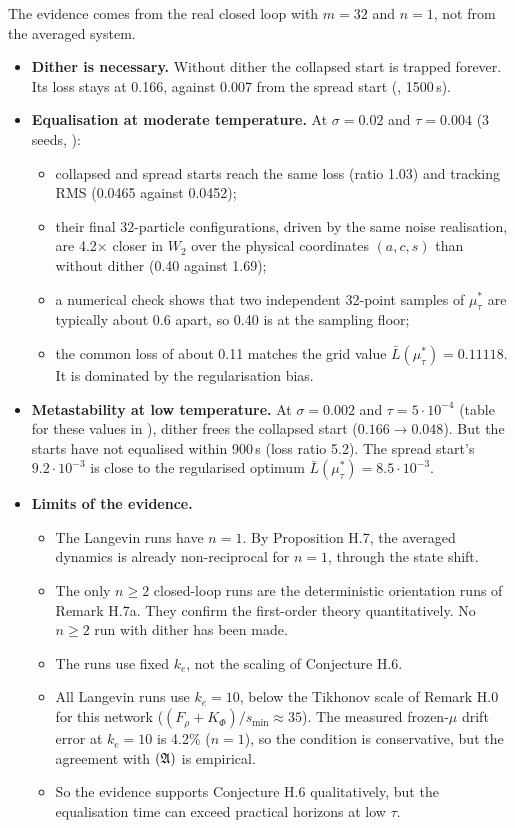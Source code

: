 The evidence comes from the real closed loop with $m=32$ and $n=1$, not from the averaged system.
\begin{itemize}
  \item \textbf{Dither is necessary.} Without dither the collapsed start is trapped forever. Its loss stays at 0.166,
    against 0.007 from the spread start (, 1500\,s).
  \item \textbf{Equalisation at moderate temperature.} At $\sigma=0.02$ and $\tau=0.004$ (3 seeds,
    ):
    \begin{itemize}
      \item collapsed and spread starts reach the same loss (ratio 1.03) and tracking RMS (0.0465 against 0.0452);
      \item their final 32-particle configurations, driven by the same noise realisation, are 4.2$\times$ closer in
        $W_2$ over the physical coordinates $(a,c,s)$ than without dither (0.40 against 1.69);
      \item a numerical check shows that two independent 32-point samples of $\mu^*_\tau$ are typically about 0.6
        apart, so 0.40 is at the sampling floor;
      \item the common loss of about 0.11 matches the grid value $\bar L(\mu^*_\tau)=0.11118$. It is dominated by the
        regularisation bias.
    \end{itemize}
  \item \textbf{Metastability at low temperature.} At $\sigma=0.002$ and $\tau=5\cdot10^{-4}$ (table for these
    values in ), dither frees the collapsed start ($0.166\to0.048$). But the starts have
    not equalised within 900\,s (loss ratio 5.2). The spread start's $9.2\cdot10^{-3}$ is close to the regularised
    optimum $\bar L(\mu^*_\tau)=8.5\cdot10^{-3}$.
  \item \textbf{Limits of the evidence.}
    \begin{itemize}
      \item The Langevin runs have $n=1$. By Proposition H.7, the averaged dynamics is already non-reciprocal for
        $n=1$, through the state shift.
      \item The only $n\ge2$ closed-loop runs are the deterministic orientation runs of Remark H.7a. They confirm the
        first-order theory quantitatively. No $n\ge2$ run with dither has been made.
      \item The runs use fixed $k_e$, not the scaling of Conjecture H.6.
      \item All Langevin runs use $k_e=10$, below the Tikhonov scale of Remark H.0 for this network
        ($(F_\rho+K_\Phi)/s_{\min}\approx35$). The measured frozen-$\mu$ drift error at $k_e=10$ is 4.2\% ($n=1$), so
        the condition is conservative, but the agreement with $(\mathfrak{A})$ is empirical.
      \item So the evidence supports Conjecture H.6 qualitatively, but the equalisation time can exceed practical
        horizons at low $\tau$.
    \end{itemize}
\end{itemize}
